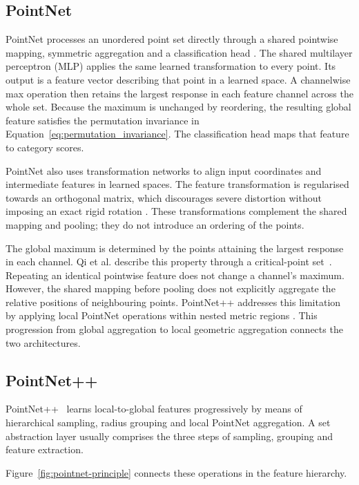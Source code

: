 \subsection{PointNet}
\label{subsec:pointnet}

PointNet processes an unordered point set directly through a shared
pointwise mapping, symmetric aggregation and a classification head
\cite{qi2017pointnet}. The shared multilayer perceptron (MLP) applies
the same learned transformation to every point. Its output is a feature
vector describing that point in a learned space. A channelwise max
operation then retains the largest response in each feature channel
across the whole set. Because the maximum is unchanged by reordering,
the resulting global feature satisfies the permutation invariance in
Equation~\eqref{eq:permutation_invariance}. The classification head maps
that feature to category scores.

PointNet also uses transformation networks to align input coordinates
and intermediate features in learned spaces. The feature transformation
is regularised towards an orthogonal matrix, which discourages severe
distortion without imposing an exact rigid rotation
\cite{qi2017pointnet}. These transformations complement the shared
mapping and pooling; they do not introduce an ordering of the points.

The global maximum is determined by the points attaining the largest
response in each channel. Qi et al. describe this property through a
critical-point set~\cite{qi2017pointnet}. Repeating an identical
pointwise feature does not change a channel's maximum. However, the
shared mapping before pooling does not explicitly aggregate the relative
positions of neighbouring points. PointNet++ addresses this limitation
by applying local PointNet operations within nested metric regions
\cite{qi2017pointnetpp}. This progression from global aggregation to
local geometric aggregation connects the two architectures.

\subsection{PointNet++}
\label{subsec:pointnetpp}

PointNet++~\cite{qi2017pointnetpp} learns local-to-global features
progressively by means of hierarchical sampling, radius grouping and local
PointNet aggregation. A set abstraction layer usually comprises the three
steps of sampling, grouping and feature extraction.

Figure~\ref{fig:pointnet-principle} connects these operations in the feature hierarchy.


